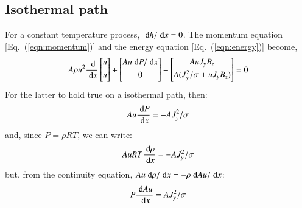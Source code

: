 \documentclass{warpdoc}
\newcommand{\ordi}{\; {\rm d}}
\newcommand{\alb}{\vspace{0.1cm}\\} %
\begin{document}
\subsection{Isothermal path}

For a constant temperature process, $\ordi h / \ordi x =0$. The momentum equation
[Eq.\ (\ref{eqn:momentum})] and the energy equation [Eq.\ (\ref{eqn:energy})] become,
%
\begin{equation}
     A\rho u^2 \frac{\ordi}{\ordi x}
     \left[
      \begin{array}{@{}c@{}}
         u\alb
         u\alb
      \end{array}
    \right]
  +\left[
      \begin{array}{@{}c@{}}
      A u \ordi P / \ordi x\alb
      0 \alb
      \end{array}
   \right]
  -\left[
      \begin{array}{@{}c@{}}
      A u J_y B_z\alb
      A (J_y^2/\sigma + u J_y B_z)\alb
      \end{array}
   \right]=0
\end{equation}
%
For the latter to hold true on a isothermal path, then:
%
\begin{equation}
A u \frac{\ordi P}{\ordi x} = -A J_y^2 / \sigma
\end{equation}
%
and, since $P=\rho R T$, we can write:
%
\begin{equation}
A u R T \frac{\ordi \rho}{\ordi x} = -A J_y^2 / \sigma
\end{equation}
%
but, from the continuity equation, $A u \ordi \rho / \ordi x=-\rho \ordi A u / \ordi x$:
%
\begin{equation}
P \frac{\ordi A u}{\ordi x} = A J_y^2 / \sigma
\end{equation}
%
%
\end{document}
